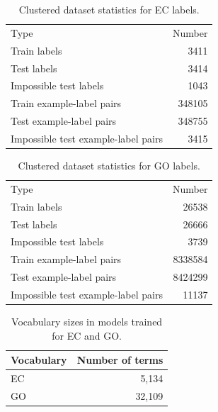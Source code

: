   \begin{table}[htbp]
    \centering
    \begin{tabular}{|l|r|}
    \hline
                                    Type &  Number \\
    \Xhline{2pt}
                            Train labels &    3411 \\
    \hline
                             Test labels &    3414 \\
    \hline
                  Impossible test labels &    1043 \\
    \hline
               Train example-label pairs &  348105 \\
    \hline
                Test example-label pairs &  348755 \\
    \hline
     Impossible test example-label pairs &    3415 \\
    \hline
    \end{tabular}
    \caption{Clustered dataset statistics for EC labels.}
    \end{table}
  \begin{table}[htbp]
  \centering
  \begin{tabular}{|l|r|}
  \hline
                                  Type &   Number \\
  \Xhline{2pt}
                          Train labels &    26538 \\
  \hline
                           Test labels &    26666 \\
  \hline
                Impossible test labels &     3739 \\
  \hline
             Train example-label pairs &  8338584 \\
  \hline
              Test example-label pairs &  8424299 \\
  \hline
   Impossible test example-label pairs &    11137 \\
  \hline
  \end{tabular}
  \caption{Clustered dataset statistics for GO labels.}
  \end{table}


  \begin{table}[htbp]
    \centering
  \begin{tabular}{|l|r|}
  \hline
  Vocabulary & Number of terms \\
  \hline
  EC & 5,134 \\
  \hline
  GO & 32,109 \\
  \hline
  \end{tabular}
  \caption{Vocabulary sizes in models trained for EC and GO.}
  \label{sup:table:vocab_sizes}
  \end{table}


